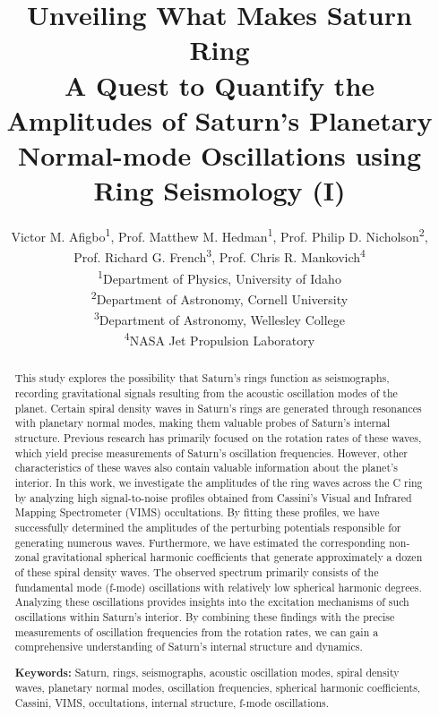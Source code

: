 \documentclass{article}
\title{Unveiling What Makes Saturn Ring \\[0.5ex] \large A Quest to Quantify the Amplitudes of Saturn's Planetary Normal-mode Oscillations using Ring Seismology (I)}
\author{Victor M. Afigbo\textsuperscript{1}, Prof. Matthew M. Hedman\textsuperscript{1}, Prof. Philip D. Nicholson\textsuperscript{2}, \\
Prof. Richard G. French\textsuperscript{3}, Prof. Chris R. Mankovich\textsuperscript{4}\\
\small\textsuperscript{1}Department of Physics, University of Idaho \\
\small\textsuperscript{2}Department of Astronomy, Cornell University\\
\small\textsuperscript{3}Department of Astronomy, Wellesley College\\
\small\textsuperscript{4}NASA Jet Propulsion Laboratory}
\begin{document}
\maketitle

\begin{abstract}
This study explores the possibility that Saturn's rings function as seismographs, recording gravitational signals resulting from the acoustic oscillation modes of the planet. Certain spiral density waves in Saturn's rings are generated through resonances with planetary normal modes, making them valuable probes of Saturn's internal structure. Previous research has primarily focused on the rotation rates of these waves, which yield precise measurements of Saturn's oscillation frequencies. However, other characteristics of these waves also contain valuable information about the planet's interior. In this work, we investigate the amplitudes of the ring waves across the C ring by analyzing high signal-to-noise profiles obtained from Cassini's Visual and Infrared Mapping Spectrometer (VIMS) occultations. By fitting these profiles, we have successfully determined the amplitudes of the perturbing potentials responsible for generating numerous waves. Furthermore, we have estimated the corresponding non-zonal gravitational spherical harmonic coefficients that generate approximately a dozen of these spiral density waves. The observed spectrum primarily consists of the fundamental mode (f-mode) oscillations with relatively low spherical harmonic degrees. Analyzing these oscillations provides insights into the excitation mechanisms of such oscillations within Saturn's interior. By combining these findings with the precise measurements of oscillation frequencies from the rotation rates, we can gain a comprehensive understanding of Saturn's internal structure and dynamics.

\vspace{0.3cm}

\textbf{Keywords:} Saturn, rings, seismographs, acoustic oscillation modes, spiral density waves, planetary normal modes, oscillation frequencies, spherical harmonic coefficients, Cassini, VIMS, occultations, internal structure, f-mode oscillations.

\end{abstract}

\end{document}
